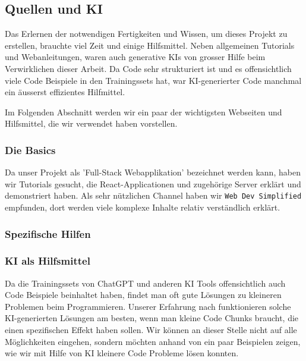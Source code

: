 \subsection{Quellen und KI}

Das Erlernen der notwendigen Fertigkeiten und Wissen, um dieses Projekt zu erstellen, brauchte viel Zeit und einige Hilfsmittel. Neben allgemeinen Tutorials und Webanleitungen, waren auch generative KIs von grosser Hilfe beim Verwirklichen dieser Arbeit. Da Code sehr strukturiert ist und es offensichtlich viele Code Beispiele in den Trainingssets hat, war KI-generierter Code manchmal ein äusserst effizientes Hilfmittel.

Im Folgenden Abschnitt werden wir ein paar der wichtigsten Webseiten und Hilfsmittel, die wir verwendet haben vorstellen.

\subsubsection{Die Basics} 
Da unser Projekt als 'Full-Stack Webapplikation' bezeichnet werden kann, haben wir Tutorials gesucht, die React-Applicationen und zugehörige Server erklärt und demonstriert haben. Als sehr nützlichen Channel haben wir \texttt{Web Dev Simplified} \cite{site:webdev} empfunden, dort werden viele komplexe Inhalte relativ verständlich erklärt.

\subsubsection{Spezifische Hilfen}

\subsubsection{KI als Hilfsmittel}
Da die Trainingssets von ChatGPT und anderen KI Tools offensichtlich auch Code Beispiele beinhaltet haben, findet man oft gute Lösungen zu kleineren Problemen beim Programmieren. Unserer Erfahrung nach funktionieren solche KI-generierten Lösungen am besten, wenn man kleine Code Chunks braucht, die einen spezifischen Effekt haben sollen. Wir können an dieser Stelle nicht auf alle Möglichkeiten eingehen, sondern möchten anhand von ein paar Beispielen zeigen, wie wir mit Hilfe von KI kleinere Code Probleme lösen konnten.

